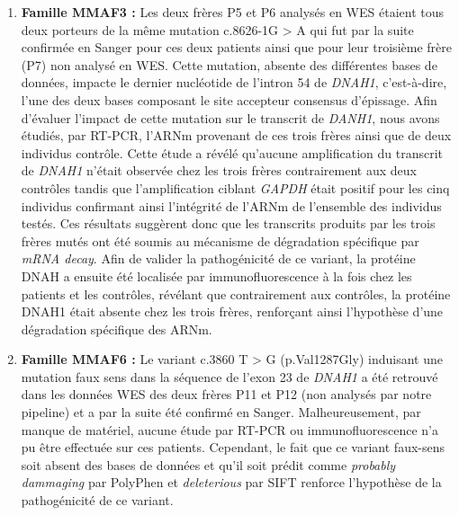 \documentclass[12pt,a4paper,twoside]{ugathesis}
\begin{document}
\begin{enumerate}
\def\labelenumi{\arabic{enumi}.}
\item
  \textbf{Famille MMAF3 :} Les deux frères P5 et P6 analysés en WES
  étaient tous deux porteurs de la même mutation c.8626-1G
  \textgreater{} A qui fut par la suite confirmée en Sanger pour ces
  deux patients ainsi que pour leur troisième frère (P7) non analysé en
  WES. Cette mutation, absente des différentes bases de données, impacte
  le dernier nucléotide de l'intron 54 de \emph{DNAH1}, c'est-à-dire,
  l'une des deux bases composant le site accepteur consensus d'épissage.
  Afin d'évaluer l'impact de cette mutation sur le transcrit de
  \emph{DANH1}, nous avons étudiés, par RT-PCR, l'ARNm provenant de ces
  trois frères ainsi que de deux individus contrôle. Cette étude a
  révélé qu'aucune amplification du transcrit de \emph{DNAH1} n'était
  observée chez les trois frères contrairement aux deux contrôles tandis
  que l'amplification ciblant \emph{GAPDH} était positif pour les cinq
  individus confirmant ainsi l'intégrité de l'ARNm de l'ensemble des
  individus testés. Ces résultats suggèrent donc que les transcrits
  produits par les trois frères mutés ont été soumis au mécanisme de
  dégradation spécifique par \emph{mRNA decay}. Afin de valider la
  pathogénicité de ce variant, la protéine DNAH a ensuite été localisée
  par immunofluorescence à la fois chez les patients et les contrôles,
  révélant que contrairement aux contrôles, la protéine DNAH1 était
  absente chez les trois frères, renforçant ainsi l'hypothèse d'une
  dégradation spécifique des ARNm.
\item
  \textbf{Famille MMAF6 :} Le variant c.3860 T \textgreater{} G
  (p.Val1287Gly) induisant une mutation faux sens dans la séquence de
  l'exon 23 de \emph{DNAH1} a été retrouvé dans les données WES des deux
  frères P11 et P12 (non analysés par notre pipeline) et a par la suite
  été confirmé en Sanger. Malheureusement, par manque de matériel,
  aucune étude par RT-PCR ou immunofluorescence n'a pu être effectuée
  sur ces patients. Cependant, le fait que ce variant faux-sens soit
  absent des bases de données et qu'il soit prédit comme \emph{probably
  dammaging} par PolyPhen et \emph{deleterious} par SIFT renforce
  l'hypothèse de la pathogénicité de ce variant.
\end{enumerate}
\end{document}
